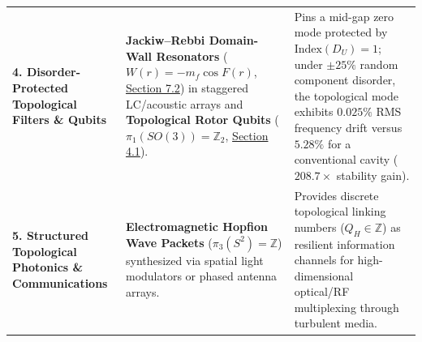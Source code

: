 \documentclass[10pt,aps,prd,twocolumn,superscriptaddress,nofootinbib,floatfix,longbibliography,showkeys]{revtex4-2}
\begin{document}
\begin{table}[t]
\begin{tabular}{p{}p{}p{}}
\textbf{4. Disorder-Protected Topological Filters \& Qubits} & \textbf{Jackiw--Rebbi Domain-Wall Resonators} ($W(r) = -m_f \cos F(r)$, \hyperref[sec:7.2]{Section 7.2}) in staggered LC/acoustic arrays and \textbf{Topological Rotor Qubits} ($\pi_1(SO(3)) = \mathbb{Z}_2$, \hyperref[sec:4.1]{Section 4.1}). & Pins a mid-gap zero mode protected by $\text{Index}(D_U) = 1$; under $\pm 25\%$ random component disorder, the topological mode exhibits $0.025\%$ RMS frequency drift versus $5.28\%$ for a conventional cavity ($208.7\times$ stability gain). \\
\textbf{5. Structured Topological Photonics \& Communications} & \textbf{Electromagnetic Hopfion Wave Packets} ($\pi_3(S^2) = \mathbb{Z}$) synthesized via spatial light modulators or phased antenna arrays. & Provides discrete topological linking numbers ($Q_H \in \mathbb{Z}$) as resilient information channels for high-dimensional optical/RF multiplexing through turbulent media. \\
\bottomrule
\end{tabular}
\end{table}
\end{document}
